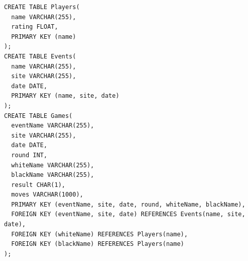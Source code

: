 \documentclass[12pt]{article}
\begin{document}
\begin{verbatim}
CREATE TABLE Players(
  name VARCHAR(255),
  rating FLOAT,
  PRIMARY KEY (name)
);
CREATE TABLE Events(
  name VARCHAR(255),
  site VARCHAR(255),
  date DATE,
  PRIMARY KEY (name, site, date)
);
CREATE TABLE Games(
  eventName VARCHAR(255),
  site VARCHAR(255),
  date DATE,
  round INT,
  whiteName VARCHAR(255),
  blackName VARCHAR(255),
  result CHAR(1),
  moves VARCHAR(1000),
  PRIMARY KEY (eventName, site, date, round, whiteName, blackName),
  FOREIGN KEY (eventName, site, date) REFERENCES Events(name, site, date),
  FOREIGN KEY (whiteName) REFERENCES Players(name),
  FOREIGN KEY (blackName) REFERENCES Players(name)
);
\end{verbatim}


    
    
    
\end{document}
